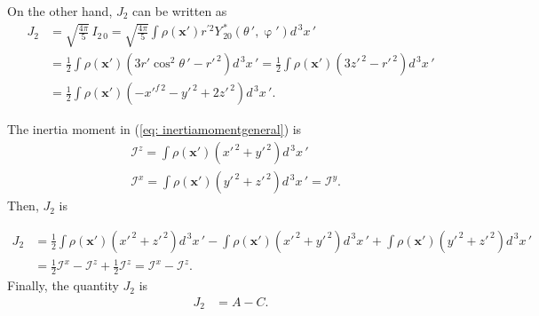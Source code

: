 On the other hand,  $J_2$ can be written as 
\begin{align*}
J_2 &= \sqrt{\frac{4\pi}{5}}\, I_{2\,0}
= \sqrt{\frac{4\pi}{5}} \int \rho(\mathbf{x'}) r^{'2} Y ^ {\,*}_{\,20}(\theta\,', \upvarphi')d^{\,3}x\,'\\
&= \frac{1}{2}\int \rho(\mathbf{x'}) (3r' \cos^2{\theta \,'} - r'^{\,2} ) d^{\,3}x\,' = \frac{1}{2}\int \rho(\mathbf{x'}) (3z'^{\,2} - r'^{\,2} ) d^{\,3}x\,'\\
& = \frac{1}{2}\int \rho(\mathbf{x'}) (-x'^{f\,2} - y'^{\,2}+ 2z'^{\,2} ) d^{\,3}x\,'.
\end{align*}

The inertia moment in (\ref{eq: inertiamomentgeneral}) is
\begin{align}
	&\mathcal{I}^{z} = \int \rho(\mathbf{x'}) (x'^{\,2} + y'^{\,2}) d^{\,3}x\,'\\
	&\mathcal{I}^{x} = \int \rho(\mathbf{x'}) (y'^{\,2} + z'^{\,2}) d^{\,3}x\,' = \mathcal{I}^{y}.
\end{align}
Then, $J_2$ is

\begin{align*}
J_2 &= 
\frac{1}{2}\int \rho(\mathbf{x'}) (x'^{\,2} + z'^{\,2}) d^{\,3}x\,' - \int \rho(\mathbf{x'}) (x'^{\,2} + y'^{\,2}) d^{\,3}x\,'  + \int \rho(\mathbf{x'}) (y'^{\,2} + z'^{\,2})d^{\,3}x\,' \\
&=\frac{1}{2} \mathcal{I}^{x} - \mathcal{I}^{z} +\frac{1}{2} \mathcal{I}^{z} = \mathcal{I}^{x} - \mathcal{I}^{z}.
\end{align*}
Finally, the quantity $J_2$ is
\begin{align}
J_2 &= A -C.
\end{align}


